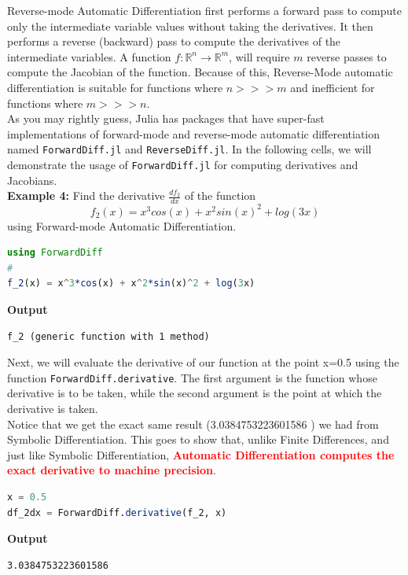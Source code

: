 Reverse-mode Automatic Differentiation first performs a forward pass to compute only the intermediate variable values without taking the derivatives. It then performs a reverse (backward) pass to compute the derivatives of the intermediate variables. A function $f : \mathbb{R}^n \rightarrow \mathbb{R}^m$, will require $m$ reverse passes to compute the Jacobian of the function. Because of this, Reverse-Mode automatic differentiation is suitable for functions where $n >>> m$ and inefficient for functions where $m >>> n$.\\

As you may rightly guess, Julia has packages that have super-fast implementations of forward-mode and reverse-mode automatic differentiation named \texttt{ForwardDiff.jl} and \texttt{ReverseDiff.jl}. In the following cells, we will demonstrate the usage of \texttt{ForwardDiff.jl} for computing derivatives and Jacobians.\\

\textbf{Example 4:} Find the derivative $\frac{d f_2}{d x}$ of the function 
$$f_2(x) = x^3cos(x) + x^2sin(x)^2 + log(3x)$$ using Forward-mode Automatic Differentiation.

\begin{lstlisting}[language=Julia,style=mystyle]
using ForwardDiff
#
f_2(x) = x^3*cos(x) + x^2*sin(x)^2 + log(3x)
\end{lstlisting}
\textbf{Output} 
\begin{verbatim}
f_2 (generic function with 1 method)
\end{verbatim}

Next, we will evaluate the derivative of our function at the point x=0.5 using the function \texttt{ForwardDiff.derivative}. The first argument is the function whose derivative is to be taken, while the second argument is the point at which the derivative is taken.\\

Notice that we get the exact same result (3.0384753223601586 ) we had from Symbolic Differentiation. This goes to show that, unlike Finite Differences, and just like Symbolic Differentiation, \textcolor{red}{\bf Automatic Differentiation computes the exact derivative to machine precision}.

\begin{lstlisting}[language=Julia,style=mystyle]
x = 0.5
df_2dx = ForwardDiff.derivative(f_2, x)
\end{lstlisting}
\textbf{Output} 
\begin{verbatim}
3.0384753223601586
\end{verbatim}

